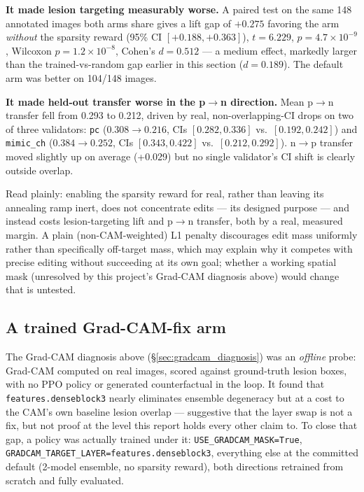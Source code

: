 \documentclass[11pt]{article}
\begin{document}
\textbf{It made lesion targeting measurably worse.} A paired test on the
same 148 annotated images both arms share gives a lift gap of $+0.275$
favoring the arm \emph{without} the sparsity reward (95\% CI
$[+0.188, +0.363]$), $t=6.229$, $p=4.7\times10^{-9}$, Wilcoxon
$p=1.2\times10^{-8}$, Cohen's $d=0.512$ — a medium effect, markedly
larger than the trained-vs-random gap earlier in this section
($d=0.189$). The default arm was better on 104/148 images.

\textbf{It made held-out transfer worse in the p$\to$n direction.} Mean
p$\to$n transfer fell from 0.293 to 0.212, driven by real, non-overlapping-CI
drops on two of three validators: \texttt{pc} ($0.308\to0.216$, CIs
$[0.282,0.336]$ vs.\ $[0.192,0.242]$) and \texttt{mimic\_ch}
($0.384\to0.252$, CIs $[0.343,0.422]$ vs.\ $[0.212,0.292]$). n$\to$p
transfer moved slightly up on average (+0.029) but no single validator's
CI shift is clearly outside overlap.

Read plainly: enabling the sparsity reward for real, rather than leaving
its annealing ramp inert, does not concentrate edits — its designed
purpose — and instead costs lesion-targeting lift and p$\to$n transfer, both
by a real, measured margin. A plain (non-CAM-weighted) L1 penalty
discourages edit mass uniformly rather than specifically off-target mass,
which may explain why it competes with precise editing without
succeeding at its own goal; whether a working spatial mask (unresolved by
this project's Grad-CAM diagnosis above) would change that is untested.

\subsection{A trained Grad-CAM-fix arm}
\label{sec:gradcam_fix_retrain}

The Grad-CAM diagnosis above (\S\ref{sec:gradcam_diagnosis}) was an
\emph{offline} probe: Grad-CAM computed on real images, scored against
ground-truth lesion boxes, with no PPO policy or generated counterfactual
in the loop. It found that \texttt{features.denseblock3} nearly eliminates
ensemble degeneracy but at a cost to the CAM's own baseline lesion
overlap — suggestive that the layer swap is not a fix, but not proof at
the level this report holds every other claim to. To close that gap, a
policy was actually trained under it: \texttt{USE\_GRADCAM\_MASK=True},
\texttt{GRADCAM\_TARGET\_LAYER=features.denseblock3}, everything else at
the committed default (2-model ensemble, no sparsity reward), both
directions retrained from scratch and fully evaluated.
\end{document}

